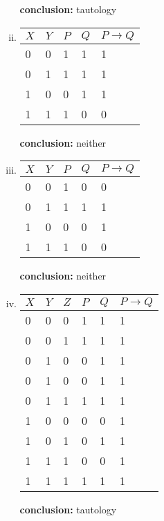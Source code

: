 \documentclass{article}
\begin{document}
\begin{enumerate}
\begin{enumerate}[(i)]
\begin{tabular}{|l|l|l|l|l|l|}
           \end{tabular}
          \textbf{conclusion:} tautology
    \item %
          \begin{tabular}{|l|l|l|l|l|}
            \hline
            $X$ & $Y$ & $P$ & $Q$ & $P\to Q$\\ \hline
            0&0&1&1&1\\
            0&1&1&1&1\\
            1&0&0&1&1\\
            1&1&1&0&0\\\hline
          \end{tabular}
          \textbf{conclusion:} neither
    \item %
          \begin{tabular}{|l|l|l|l|l|}
            \hline
            $X$ & $Y$ & $P$ & $Q$ & $P\to Q$\\ \hline
            0&0&1&0&0\\
            0&1&1&1&1\\
            1&0&0&0&1\\
            1&1&1&0&0\\\hline
          \end{tabular}
          \textbf{conclusion:} neither
    \item %
          \begin{tabular}{|l|l|l|l|l|l|}
            \hline
            $X$ & $Y$ & $Z$ & $P$ & $Q$ & $P\to Q$\\ \hline
            0&0&0&1&1&1\\
            0&0&1&1&1&1\\
            0&1&0&0&1&1\\
            0&1&0&0&1&1\\
            0&1&1&1&1&1\\
            1&0&0&0&0&1\\
            1&0&1&0&1&1\\
            1&1&1&0&0&1\\
            1&1&1&1&1&1\\\hline
          \end{tabular}
          \textbf{conclusion:} tautology
  \end{enumerate}


\end{enumerate}
\end{document}
